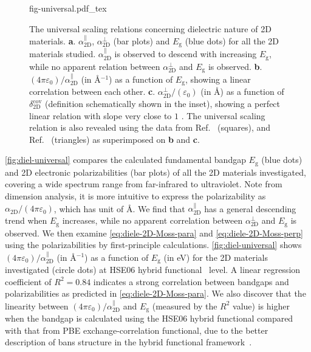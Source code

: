 \begin{figure}[!htbp]
\centering
{fig-universal.pdf_tex}
\caption{\label{fig:diel-universal} The universal scaling relations
  concerning dielectric nature of 2D materials.
  \textbf{a}. $\alpha_{\mathrm{2D}}^{\parallel}$,
  $\alpha_{\mathrm{2D}}^{\perp}$ (bar plots) and $E_{\mathrm{g}}$
  (blue dots) for all the 2D materials studied.
  $\alpha_{\mathrm{2D}}^{\parallel}$ is observed to descend with
  increasing $E_{\mathrm{g}}$, while no apparent relation between
  $\alpha_{\mathrm{2D}}^{\perp}$ and $E_{\mathrm{g}}$ is
  observed. \textbf{b}.
  $(4\pi \varepsilon_{0})/\alpha_{\mathrm{2D}}^{\parallel}$ (in
  \AA{}$^{-1}$) as a function of $E_{\mathrm{g}}$, showing a linear
  correlation between each other.  \textbf{c}.
  $\alpha_{\mathrm{2D}}^{\perp}/(\varepsilon_{0})$ (in \AA{}) as a
  function of $\delta_{\mathrm{2D}}^{\mathrm{cov}}$ (definition schematically shown
  in the inset), showing a perfect linear relation with slope very
  close to $1$ . The universal scaling relation is also revealed using
  the data from Ref.~\cite{Haastrup_2018_database} (squares), and
  Ref.~\cite{Mounet_2018_database} (triangles) as superimposed on
  \textbf{b} and \textbf{c}.  }
\end{figure}
\autoref{fig:diel-universal} compares the calculated fundamental bandgap
$E_{\mathrm{g}}$ (blue dots) and 2D electronic polarizabilities (bar
plots) of all the 2D materials investigated, covering a wide spectrum
range from far-infrared to ultraviolet.  Note from dimension analysis,
it is more intuitive to express the polarizability as
$\alpha_{\mathrm{2D}}/(4 \pi \varepsilon_{0})$, which has unit of
\AA{}. We find that $\alpha_{\mathrm{2D}}^{\parallel}$ has a general
descending trend when $E_{\mathrm{g}}$ increases, while no apparent
correlation between $\alpha_{\mathrm{2D}}^{\perp}$ and
$E_{\mathrm{g}}$ is observed.
%
We then examine \autoref{eq:diele-2D-Moss-para} and
\autoref{eq:diele-2D-Moss-perp} using the polarizabilities by
first-principle calculations.  \autoref{fig:diel-universal}
shows $(4 \pi \varepsilon_{0})/\alpha_{\mathrm{2D}}^{\parallel}$ (in
\AA{}$^{-1}$) as a function of $E_{\mathrm{g}}$ (in eV) for the 2D
materials investigated (circle dots) at HSE06 hybrid
functional~\cite{Heyd_2003_HSe,HSE_2006_erratum} level.  A linear
regression coefficient of $R^{2}=0.84$ indicates a strong correlation
between bandgaps and polarizabilities as predicted in
\autoref{eq:diele-2D-Moss-para}.  We also discover that the linearity
between $(4 \pi \varepsilon_{0})/\alpha_{\mathrm{2D}}^{\parallel}$ and
$E_{\mathrm{g}}$ (measured by the $R^{2}$ value) is higher when the
bandgap is calculated using the HSE06 hybrid functional compared with
that from PBE exchange-correlation functional, due to the better
description of bans structure in the hybrid functional
framework~\cite{Heyd_2005_HSE_GAP}.




